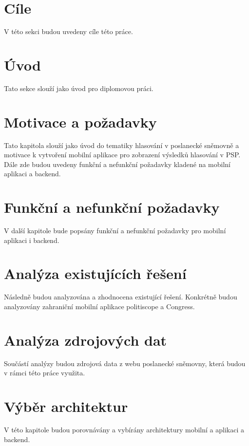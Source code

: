 \documentclass[czech,master,unicode]{ctufit-thesis}
\theoremstyle{plain}
\theoremstyle{definition}
\theoremstyle{remark}
\numberwithin{theorem}{chapter}
\begin{document}
\begin{summarypage}
	
\section*{Cíle}
V této sekci budou uvedeny cíle této práce.

\section*{Úvod}
Tato sekce slouží jako úvod pro diplomovou práci.

\section*{Motivace a požadavky}
Tato kapitola slouží jako úvod do tematiky hlasování v poslanecké sněmovně a motivace k vytvoření mobilní aplikace pro zobrazení výsledků hlasování v PSP. Dále zde budou uvedeny funkční \linebreak a nefunkční požadavky kladené na mobilní aplikaci a backend.

\section*{Funkční a nefunkční požadavky}
V další kapitole bude popsány funkční a nefunkční požadavky pro mobilní aplikaci i backend.

\section*{Analýza existujících řešení}
Následně budou analyzována a zhodnocena existující řešení. Konkrétně budou analyzovány zahraniční mobilní aplikace politiscope a Congress.

\section*{Analýza zdrojových dat}
Součástí analýzy budou zdrojová data z webu poslanecké sněmovny, která budou v rámci této práce využita.

\section*{Výběr architektur}
V této kapitole budou porovnávány a vybírány architektury mobilní a aplikaci a backend.


\end{summarypage}
\end{document}
